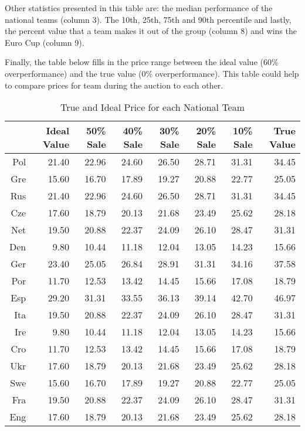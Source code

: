 \documentclass{article}\usepackage[]{graphicx}\usepackage[]{color}
\begin{document}
Other statistics presented in this table are: the median performance of the national teams (column 3). The 10th, 25th, 75th and 90th percentile and lastly, the percent value that a team makes it out of the group (column 8) and wins the Euro Cup (column 9).

Finally, the table below fills in the price range between the ideal value (60\% overperformance) and the true value (0\% overperformance). This table could help to compare prices for team during the auction to each other.

\vspace{10mm}

\begin{table}[ht]
\centering
{\scriptsize
\begin{tabular}{rrrrrrrr}
  \hline
 & Ideal Value & 50\% Sale & 40\% Sale & 30\% Sale & 20\% Sale & 10\% Sale & True Value \\ 
  \hline
Pol & 21.40 & 22.96 & 24.60 & 26.50 & 28.71 & 31.31 & 34.45 \\ 
  Gre & 15.60 & 16.70 & 17.89 & 19.27 & 20.88 & 22.77 & 25.05 \\ 
  Rus & 21.40 & 22.96 & 24.60 & 26.50 & 28.71 & 31.31 & 34.45 \\ 
  Cze & 17.60 & 18.79 & 20.13 & 21.68 & 23.49 & 25.62 & 28.18 \\ 
  Net & 19.50 & 20.88 & 22.37 & 24.09 & 26.10 & 28.47 & 31.31 \\ 
  Den & 9.80 & 10.44 & 11.18 & 12.04 & 13.05 & 14.23 & 15.66 \\ 
  Ger & 23.40 & 25.05 & 26.84 & 28.91 & 31.31 & 34.16 & 37.58 \\ 
  Por & 11.70 & 12.53 & 13.42 & 14.45 & 15.66 & 17.08 & 18.79 \\ 
  Esp & 29.20 & 31.31 & 33.55 & 36.13 & 39.14 & 42.70 & 46.97 \\ 
  Ita & 19.50 & 20.88 & 22.37 & 24.09 & 26.10 & 28.47 & 31.31 \\ 
  Ire & 9.80 & 10.44 & 11.18 & 12.04 & 13.05 & 14.23 & 15.66 \\ 
  Cro & 11.70 & 12.53 & 13.42 & 14.45 & 15.66 & 17.08 & 18.79 \\ 
  Ukr & 17.60 & 18.79 & 20.13 & 21.68 & 23.49 & 25.62 & 28.18 \\ 
  Swe & 15.60 & 16.70 & 17.89 & 19.27 & 20.88 & 22.77 & 25.05 \\ 
  Fra & 19.50 & 20.88 & 22.37 & 24.09 & 26.10 & 28.47 & 31.31 \\ 
  Eng & 17.60 & 18.79 & 20.13 & 21.68 & 23.49 & 25.62 & 28.18 \\ 
   \hline
\end{tabular}
}
\caption{True and Ideal Price for each National Team} 
\end{table}
\end{document}
